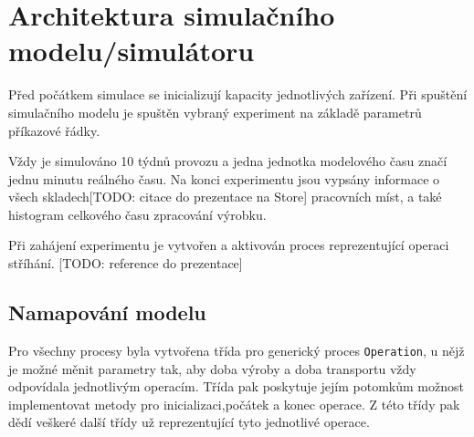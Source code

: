 \documentclass[11pt, a4paper]{article}
\begin{document}
\section{Architektura simulačního modelu/simulátoru}
Před počátkem simulace se inicializují kapacity jednotlivých zařízení. Při spuštění simulačního modelu je spuštěn vybraný experiment na základě parametrů příkazové řádky. 

Vždy je simulováno 10 týdnů provozu a jedna jednotka modelového času značí jednu minutu reálného času. Na konci experimentu jsou vypsány informace o všech skladech[TODO: citace do prezentace na Store] pracovních míst, a také histogram celkového času zpracování výrobku.

Při zahájení experimentu je vytvořen a aktivován proces reprezentující operaci stříhání. [TODO: reference do prezentace]
\newpage
\subsection{Namapování modelu}
Pro všechny procesy byla vytvořena třída pro generický proces \verb|Operation|, u nějž je možné měnit parametry tak, aby doba výroby a doba transportu vždy odpovídala jednotlivým operacím. Třída pak poskytuje jejím potomkům možnost implementovat metody pro inicializaci,počátek a konec operace. Z této třídy pak dědí veškeré další třídy už reprezentující tyto jednotlivé operace. 
\end{document}
